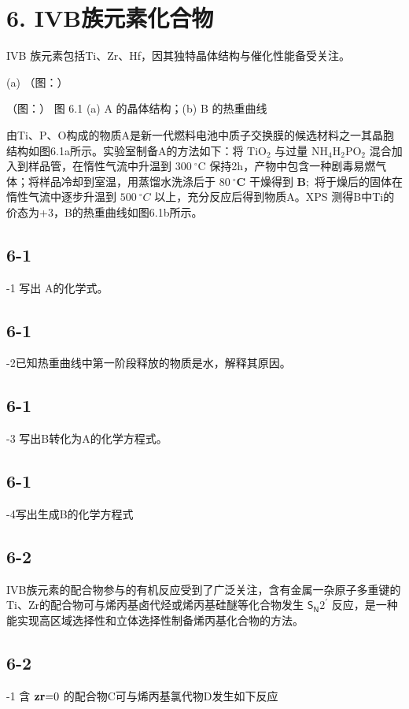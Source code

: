 \section*{6. IVB族元素化合物}
IVB 族元素包括Ti、Zr、Hf，因其独特晶体结构与催化性能备受关注。

(a)
（图：）

（图：）
图 6.1 (a) A 的晶体结构；(b) B 的热重曲线

由Ti、P、O构成的物质A是新一代燃料电池中质子交换膜的候选材料之一其晶胞结构如图6.1a所示。实验室制备A的方法如下：将 $\mathrm { T i O } _ { 2 }$ 与过量 $\mathrm { N H } _ { 4 } \mathrm { H } _ { 2 } \mathrm { P O } _ { 2 }$ 混合加入到样品管，在惰性气流中升温到 $3 0 0 ~ ^ { \circ } \mathrm { C }$ 保持2h，产物中包含一种剧毒易燃气体；将样品冷却到室温，用蒸馏水洗涤后于 $8 0 ~ ^ { \circ } \mathbf { C }$ 干燥得到 $\mathbf { B } ;$ 将于燥后的固体在惰性气流中逐步升温到 $5 0 0 ~ ^ { \circ } C$ 以上，充分反应后得到物质A。XPS 测得B中Ti的价态为+3，B的热重曲线如图6.1b所示。

\subsection*{6-1}
-1 写出 A的化学式。

\subsection*{6-1}
-2已知热重曲线中第一阶段释放的物质是水，解释其原因。

\subsection*{6-1}
-3 写出B转化为A的化学方程式。

\subsection*{6-1}
-4写出生成B的化学方程式

\subsection*{6-2}
IVB族元素的配合物参与的有机反应受到了广泛关注，含有金属一杂原子多重键的Ti、Zr的配合物可与烯丙基卤代烃或烯丙基硅醚等化合物发生 $\mathsf { S } _ { \mathsf { N } } 2 ^ { \prime }$ 反应，是一种能实现高区域选择性和立体选择性制备烯丙基化合物的方法。

\subsection*{6-2}
-1 含 ${ \bf z } { \bf r } { = } 0$ 的配合物C可与烯丙基氯代物D发生如下反应

